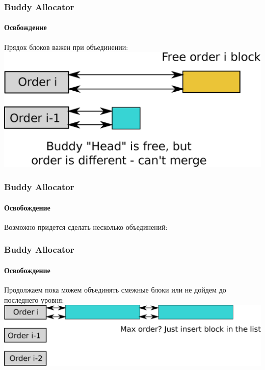 \begin{frame}
\frametitle{Buddy Allocator}
\framesubtitle{Освбождение}

Прядок блоков важен при объединении:
\includegraphics[width=.9\linewidth]{buddy-free0}
\end{frame}

\begin{frame}
\frametitle{Buddy Allocator}
\framesubtitle{Освобождение}

Возможно придется сделать несколько объединений:

\end{frame}

\begin{frame}
\frametitle{Buddy Allocator}
\framesubtitle{Освобождение}

Продолжаем пока можем объединять смежные блоки или не дойдем до последнего уровня:
\includegraphics[width=.9\linewidth]{buddy-free4}
\end{frame}

